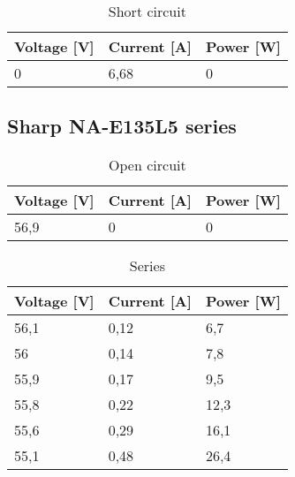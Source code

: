 \documentclass[12pt]{article}
\begin{document}
\begin{table}[!h]
	\centering
	\begin{tabular}{|p{2cm}|p{2cm}|p{2cm}|}
		\hline
		\rowcolor{Red!80} Voltage [V] & Current [A] & Power [W] \\
		\hline
		\rowcolor{Red!60} 0           &     6,68        &     0      \\
		\hline
	\end{tabular}
	\caption{Short circuit}
	\label{tab:my_label}
\end{table}
\FloatBarrier
\subsection{Sharp NA-E135L5 series}
\begin{table}[!h]
	\centering
	\begin{tabular}{|p{2cm}|p{2cm}|p{2cm}|}
		\hline
		\rowcolor{RoyalBlue!80} Voltage [V] & Current [A] & Power [W] \\
		\hline
		\rowcolor{Cerulean!70}     56,9     & 0           & 0         \\
		\hline
	\end{tabular}
	\caption{Open circuit}
	\label{tab:my_label}
\end{table}

\begin{table}[!h]
	\centering
	\begin{tabular}{|p{2cm}|p{2cm}|p{2cm}|}
		\hline
		\rowcolor{Green!80} Voltage [V]  & Current [A] & Power [W] \\
		\hline
		\rowcolor{LimeGreen!70}   56,1   & 0,12        & 6,7       \\
		\hline
		\rowcolor{YellowGreen!70}  56    & 0,14        & 7,8       \\
		\hline
		\rowcolor{LimeGreen!70}     55,9 & 0,17        & 9,5       \\
		\hline
		\rowcolor{YellowGreen!70}  55,8  & 0,22        & 12,3      \\
		\hline
		\rowcolor{LimeGreen!70}    55,6  & 0,29        & 16,1      \\
		\hline
		\rowcolor{YellowGreen!70} 55,1   & 0,48        & 26,4      \\
		\hline
	\end{tabular}
	\caption{Series}
	\label{tab:my_label}
\end{table}
\end{document}
